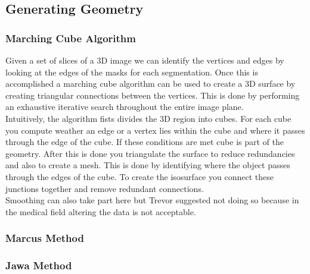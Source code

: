 \subsection{Generating Geometry}

\subsubsection{Marching Cube Algorithm}
Given a set of slices of a 3D image we can identify the vertices and edges by looking at the edges of the masks for each segmentation.  Once this is accomplished a marching cube algorithm can be used to create a 3D surface by creating triangular connections between the vertices. This is done by performing an exhaustive iterative search throughout the entire image plane\cite{lorensen1987marching}.\\  

Intuitively, the algorithm fists divides the 3D region into cubes.  For each cube you compute weather an edge or a vertex lies within the cube and where it passes through the edge of the cube. If these conditions are met cube is part of the geometry.  After this is done you triangulate the surface to reduce redundancies and also to create a mesh. This is done by identifying where the object passes through the edges of the cube.  To create the isosurface you connect these junctions together and remove redundant connections.\\

Smoothing can also take part here but Trevor suggested not doing so because in the medical field altering the data is not acceptable.\\

\subsubsection{Marcus Method}

\subsubsection{Jawa Method}